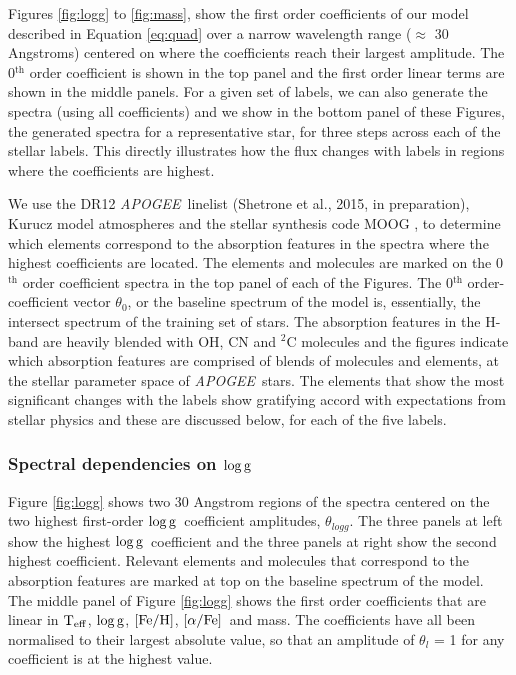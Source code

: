\documentclass[12pt, preprint]{aastex}
\newcommand{\project}[1]{\textsl{#1}}
\newcommand{\apogee}{\project{APOGEE}}
\newcommand{\teff}{\mbox{$\rm T_{eff}$}}
\newcommand{\feh}{\mbox{$\rm [Fe/H]$}}
\newcommand{\alphafe}{\mbox{$\rm [\alpha/Fe]$}}
\newcommand{\logg}{\mbox{$\rm \log g$}}
\begin{document}
Figures \ref{fig:logg} to \ref{fig:mass}, show the first order coefficients of our model described in Equation \ref{eq:quad} over a narrow wavelength range ($\approx$ 30 Angstroms) centered on where the coefficients reach their largest amplitude. The 0$^{\mbox{th}}$ order coefficient is shown in the top panel and the first order linear terms are shown in the middle panels. For a given set of labels, we can also generate the spectra (using all coefficients) and we  show in the bottom panel of these Figures, the generated spectra for a representative star, for three steps across each of the stellar labels. This directly illustrates how the flux changes with labels in regions where the coefficients are highest.  

We use the DR12 \apogee\ linelist (Shetrone et al., 2015, in preparation), Kurucz model atmospheres \citep{castelli2004} and the stellar synthesis code MOOG \citep{sneden1979}, to determine which elements correspond to the absorption features in the spectra where the highest coefficients are located. The elements and molecules are marked on the 0$^{\mbox{th}}$ order coefficient spectra in the top panel of each of the Figures. The 0$^{\mbox{th}}$ order-coefficient vector $\theta_0$, or the baseline spectrum of the model is, essentially, the intersect spectrum of the training set of stars. The absorption features in the H-band are heavily blended with OH, CN and $^2$C molecules and the figures indicate which absorption features are comprised of blends of molecules and elements, at the stellar parameter space of \apogee\ stars. The elements that show the most significant changes with the labels show gratifying accord with expectations from stellar physics and these are discussed below, for each of the five labels. 

\subsubsection{Spectral dependencies on \logg} 

Figure \ref{fig:logg} shows two 30 Angstrom regions of the spectra centered on the two highest first-order \logg\ coefficient amplitudes, $\theta_{logg}$. The three panels at left show the highest \logg\ coefficient and the three panels at right show the second highest coefficient. Relevant elements and molecules that correspond to the absorption features are marked at top on the baseline spectrum of the model.  The middle panel of Figure \ref{fig:logg} shows the first order coefficients that are linear in \teff, \logg, \feh, \alphafe\ and mass. The coefficients have all been normalised to their largest absolute value, so that an amplitude of $\theta_l$ = 1 for any coefficient is at the highest value.  
\end{document}
